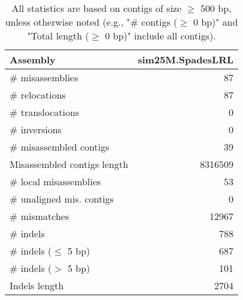 \documentclass[12pt,a4paper]{article}
\begin{document}
\begin{table}[ht]
\begin{center}
\caption{All statistics are based on contigs of size $\geq$ 500 bp, unless otherwise noted (e.g., "\# contigs ($\geq$ 0 bp)" and "Total length ($\geq$ 0 bp)" include all contigs).}
\begin{tabular}{|l*{1}{|r}|}
\hline
Assembly & sim25M.SpadesLRL \\ \hline
\# misassemblies & 87 \\ \hline
\hspace{5mm}\# relocations & 87 \\ \hline
\hspace{5mm}\# translocations & 0 \\ \hline
\hspace{5mm}\# inversions & 0 \\ \hline
\# misassembled contigs & 39 \\ \hline
Misassembled contigs length & 8316509 \\ \hline
\# local misassemblies & 53 \\ \hline
\# unaligned mis. contigs & 0 \\ \hline
\# mismatches & 12967 \\ \hline
\# indels & 788 \\ \hline
\hspace{5mm}\# indels ($\leq$ 5 bp) & 687 \\ \hline
\hspace{5mm}\# indels ($>$ 5 bp) & 101 \\ \hline
Indels length & 2704 \\ \hline
\end{tabular}
\end{center}
\end{table}
\end{document}
